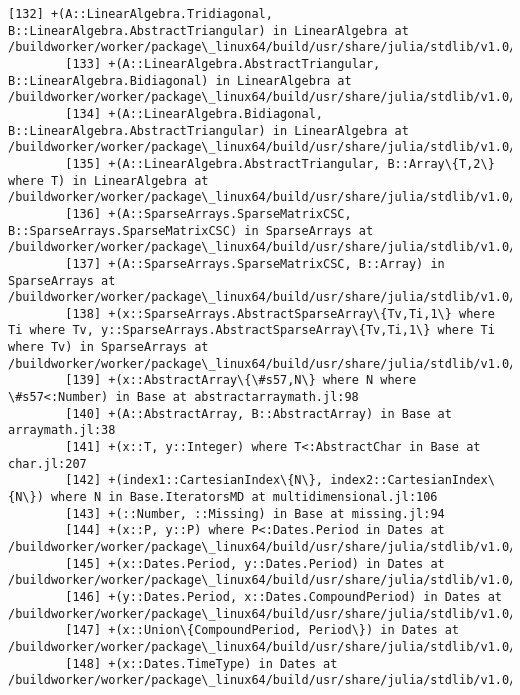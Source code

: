 \documentclass[11pt]{article}
\begin{document}
\begin{Verbatim}[commandchars=\\\{\}]
        [132] +(A::LinearAlgebra.Tridiagonal, B::LinearAlgebra.AbstractTriangular) in LinearAlgebra at /buildworker/worker/package\_linux64/build/usr/share/julia/stdlib/v1.0/LinearAlgebra/src/special.jl:125
        [133] +(A::LinearAlgebra.AbstractTriangular, B::LinearAlgebra.Bidiagonal) in LinearAlgebra at /buildworker/worker/package\_linux64/build/usr/share/julia/stdlib/v1.0/LinearAlgebra/src/special.jl:124
        [134] +(A::LinearAlgebra.Bidiagonal, B::LinearAlgebra.AbstractTriangular) in LinearAlgebra at /buildworker/worker/package\_linux64/build/usr/share/julia/stdlib/v1.0/LinearAlgebra/src/special.jl:125
        [135] +(A::LinearAlgebra.AbstractTriangular, B::Array\{T,2\} where T) in LinearAlgebra at /buildworker/worker/package\_linux64/build/usr/share/julia/stdlib/v1.0/LinearAlgebra/src/special.jl:124
        [136] +(A::SparseArrays.SparseMatrixCSC, B::SparseArrays.SparseMatrixCSC) in SparseArrays at /buildworker/worker/package\_linux64/build/usr/share/julia/stdlib/v1.0/SparseArrays/src/sparsematrix.jl:1559
        [137] +(A::SparseArrays.SparseMatrixCSC, B::Array) in SparseArrays at /buildworker/worker/package\_linux64/build/usr/share/julia/stdlib/v1.0/SparseArrays/src/sparsematrix.jl:1562
        [138] +(x::SparseArrays.AbstractSparseArray\{Tv,Ti,1\} where Ti where Tv, y::SparseArrays.AbstractSparseArray\{Tv,Ti,1\} where Ti where Tv) in SparseArrays at /buildworker/worker/package\_linux64/build/usr/share/julia/stdlib/v1.0/SparseArrays/src/sparsevector.jl:1290
        [139] +(x::AbstractArray\{\#s57,N\} where N where \#s57<:Number) in Base at abstractarraymath.jl:98
        [140] +(A::AbstractArray, B::AbstractArray) in Base at arraymath.jl:38
        [141] +(x::T, y::Integer) where T<:AbstractChar in Base at char.jl:207
        [142] +(index1::CartesianIndex\{N\}, index2::CartesianIndex\{N\}) where N in Base.IteratorsMD at multidimensional.jl:106
        [143] +(::Number, ::Missing) in Base at missing.jl:94
        [144] +(x::P, y::P) where P<:Dates.Period in Dates at /buildworker/worker/package\_linux64/build/usr/share/julia/stdlib/v1.0/Dates/src/periods.jl:69
        [145] +(x::Dates.Period, y::Dates.Period) in Dates at /buildworker/worker/package\_linux64/build/usr/share/julia/stdlib/v1.0/Dates/src/periods.jl:346
        [146] +(y::Dates.Period, x::Dates.CompoundPeriod) in Dates at /buildworker/worker/package\_linux64/build/usr/share/julia/stdlib/v1.0/Dates/src/periods.jl:348
        [147] +(x::Union\{CompoundPeriod, Period\}) in Dates at /buildworker/worker/package\_linux64/build/usr/share/julia/stdlib/v1.0/Dates/src/periods.jl:357
        [148] +(x::Dates.TimeType) in Dates at /buildworker/worker/package\_linux64/build/usr/share/julia/stdlib/v1.0/Dates/src/arithmetic.jl:8

\end{Verbatim}
\end{document}
